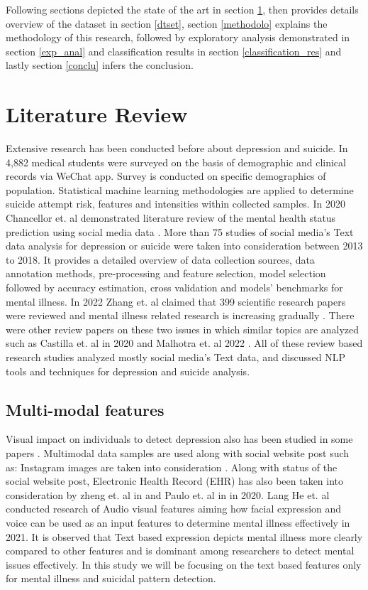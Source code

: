 \documentclass[sn-mathphys,Numbered]{sn-jnl}%
\theoremstyle{thmstyleone}%
\theoremstyle{thmstyletwo}%
\theoremstyle{thmstylethree}%
\begin{document}
Following sections depicted the state of the art in section \ref{lit_rev}, then provides details overview of the dataset in section \ref{dtset}, section \ref{methodolo} explains the methodology of this research, followed by exploratory analysis demonstrated in section \ref{exp_anal} and classification results in section \ref{classification_res} and lastly section \ref{conclu} infers the conclusion. 

\section{Literature Review}
\label{lit_rev}
Extensive research has been conducted before about depression and suicide. In \cite{shen2020detecting} 4,882 medical students were surveyed on the basis of demographic and clinical records via WeChat app. Survey is conducted on specific demographics of population. Statistical machine learning methodologies are applied to determine suicide attempt risk, features and intensities within collected samples. In 2020 Chancellor et. al demonstrated literature review of the mental health status prediction using social media data \cite{chancellor2020methods}. More than 75 studies of social media's Text data analysis for depression or suicide were taken into consideration between 2013 to 2018. It provides a detailed overview of data collection sources, data annotation methods, pre-processing and feature selection, model selection followed by accuracy estimation, cross validation and models’ benchmarks for mental illness. In 2022 Zhang et. al claimed that 399 scientific research papers were reviewed and mental illness related research is increasing gradually \cite{zhang2022natural}. There were other review papers on these two issues in which similar topics are analyzed such as Castilla et. al in 2020 \cite{castillo2020suicide} and Malhotra et. al 2022 \cite{malhotra2022deep}. All of these review based research studies analyzed mostly social media's Text data, and discussed NLP tools and techniques for depression and suicide analysis. 

\subsection{Multi-modal features}
Visual impact on individuals to detect depression also has been studied in some papers \cite{ye2021multi}. Multimodal data samples are used along with social website post such as: Instagram images are taken into consideration \cite{castillo2020suicide, chancellor2020methods}. Along with status of the social website post, Electronic Health Record (EHR) has also been taken into consideration by zheng et. al in \cite{zheng2020development} and Paulo et. al in \cite{mann2020see} in 2020. Lang He et. al conducted research of Audio visual features \cite{he2022deep} aiming how facial expression and voice can be used as an input features to determine mental illness effectively in 2021.  It is observed that Text based expression depicts mental illness more clearly compared to other features and is dominant among researchers to detect mental issues effectively. In this study we will be focusing on the text based features only for mental illness and suicidal pattern detection. 
\end{document}
